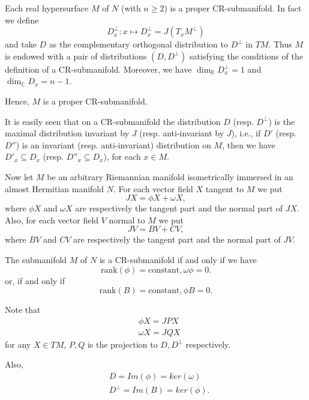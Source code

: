 \begin{example}
    Each real hypersurface $M$ of $N$ (with $n \geq 2$) is a proper CR-submanifold. In fact we define
\[
D_x^\perp : x \mapsto D_x^\perp = J(T_xM^\perp)
\]
and take $D$ as the complementary orthogonal distribution to $D^\perp$ in $TM$. Thus $M$ is endowed with a pair of distributions $(D, D^\perp)$ satisfying the conditions of the definition of a CR-submanifold. Moreover, we have $\dim _{\mathbb{R}} D_x^\perp = 1$ and $\dim_{\mathbb{C}} D_x = n - 1$.

Hence, $M$ is a proper CR-submanifold.
\end{example}


\begin{remark}
    It is easily seen that on a CR-submanifold the 
distribution \( D \) (resp. \( D^{\perp} \)) is the maximal distribution 
invariant by \( J \) (resp. anti-invariant by \( J \)), i.e., if \( D' \) 
(resp. \( D'' \)) is an invariant (resp. anti-invariant) distribution on \( M \), 
then we have \( D'_{x} \subseteq D_{x} \) (resp. \( D''_{x} \subseteq D_{x} \)), for each \( x \in M \).
\end{remark}

\begin{definition}
    Now let \( M \) be an arbitrary Riemannian manifold isometrically immersed in an almost Hermitian manifold \( N \). 
For each vector field \( X \) tangent to \( M \) we put
\begin{equation}
    JX = \phi X + \omega X,
\end{equation}
where \( \phi X \) and \( \omega X \) are respectively the tangent part and the normal part of \( JX \). Also, for each vector field \( V \) normal to \( M \) we put
\begin{equation}
    JV = BV + CV,
\end{equation}
where \( BV \) and \( CV \) are respectively the tangent part and the normal part of \( JV \).
\end{definition}


\begin{theorem}
     The submanifold \( M \) of \( N \) is a CR-submanifold if and only if we have
\[
\text{rank}(\phi) = \text{constant}, \omega\phi = 0.
\]
or, if and only if
\[
\text{rank}(B) = \text{constant}, \phi B = 0.
\]
\end{theorem}
\begin{remark}
Note that 
\begin{equation}
    \begin{aligned}
        &\phi X=JPX\\
        &\omega X=JQX
    \end{aligned}
\end{equation}
    for any $X\in TM$, $P, Q$ is the projection to $D, D^{\perp}$ respectively.

    Also, 
\begin{equation}
    \begin{aligned}
        &D=Im (\phi)=ker (\omega)\\
        &D^{\perp}=Im (B)=ker (\phi).
    \end{aligned}
\end{equation}
\end{remark}

